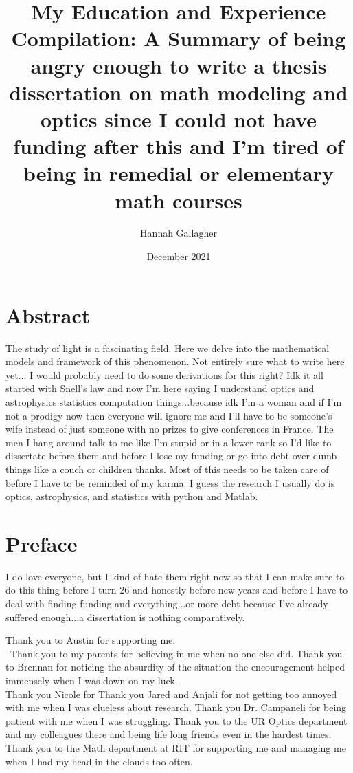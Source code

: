 \documentclass{dcthesis}
\title{My Education and Experience Compilation: A Summary of being angry enough to write a thesis dissertation on math modeling and optics since I could not have funding after this and I'm tired of being in remedial or elementary math courses}
\author{Hannah Gallagher}
\date{December 2021}
\theoremstyle{definition}
\theoremstyle{remark}
\begin{document}
\frontmatter

\maketitle
\restoregeometry

\chapter*{Abstract}
The study of light is a fascinating field. Here we delve into the mathematical models and framework of this phenomenon. Not entirely sure what to write here yet... I would probably need to do some derivations for this right? Idk it all started with Snell's law and now I'm here saying I understand optics and astrophysics statistics computation things...because idk I'm a woman and if I'm not a prodigy now then everyone will ignore me and I'll have to be someone's wife instead of just someone with no prizes to give conferences in France. The men I hang around talk to me like I'm stupid or in a lower rank so I'd like to dissertate before them and before I lose my funding or go into debt over dumb things like a couch or children thanks. Most of this needs to be taken care of before I have to be reminded of my karma. I guess the research I usually do is optics, astrophysics, and statistics with python and Matlab. 

\chapter*{Preface}
I do love everyone, but I kind of hate them right now so that I can make sure to do this thing before I turn 26 and honestly before new years and before I have to deal with finding funding and everything...or more debt because I've already suffered enough...a dissertation is nothing comparatively.  

Thank you to Austin for supporting me. \\\
Thank you to my parents for believing in me when no one else did. Thank you to Brennan for noticing the absurdity of the situation the encouragement helped immensely when I was down on my luck. \\ Thank you Nicole for 
Thank you Jared and Anjali for not getting too annoyed with me when I was clueless about research. 
Thank you Dr. Campaneli for being patient with me when I was struggling. 
Thank you to the UR Optics department and my colleagues there and being life long friends even in the hardest times. \\ 
Thank you to the Math department at RIT for supporting me and managing me when I had my head in the clouds too often. 
\end{document}
